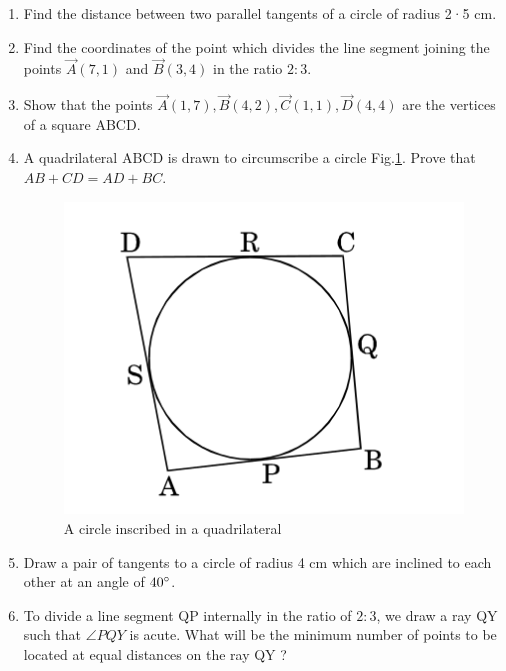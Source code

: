 \documentclass{article}
\begin{document}
\begin{enumerate}
\item Find the distance between two parallel tangents of a circle of radius 2·5 cm. 

\item Find the coordinates of the point which divides the line segment joining the points $\vec{A}(7, 1)$ and $\vec{B}( 3, 4)$ in the ratio $2 : 3$. 

\item Show that the points $\vec{A}(1,7), \vec{B}(4,2), \vec{C}(1,1), \vec{D}(4,4)$ are the vertices of a square ABCD. 

\item A quadrilateral ABCD is drawn to circumscribe a circle Fig.\ref{fig:2}. Prove that $ AB + CD = AD + BC. $
	\begin{figure}[h]
	\centering
	\includegraphics[width=\columnwidth]{figs/2.jpg}
	\caption{A circle inscribed in a quadrilateral}
	\label{fig:2}
	\end{figure}

\item Draw a pair of tangents to a circle of radius 4 cm which are inclined to each other at an angle of $40\degree$. 

\item To divide a line segment QP internally in the ratio of $2 : 3$, we draw a ray QY such that $\angle PQY$ is acute. What will be the minimum number of points to be located at equal distances on the ray QY ? 


\end{enumerate}
\end{document}
